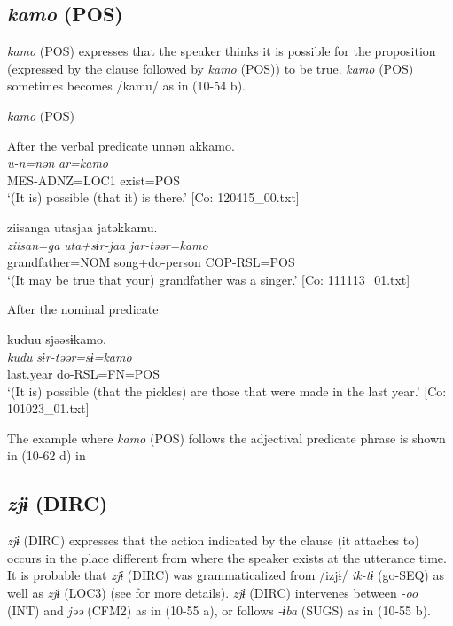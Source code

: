 \begin{xlist}
\subsection{\textit{kamo} (POS)}\label{sec:10.3.8}

\textit{kamo} (POS) expresses that the speaker thinks it is possible for the proposition (expressed by the clause followed by \textit{kamo} (POS)) to be true. \textit{kamo} (POS) sometimes becomes /kamu/ as in (10-54 b).

\ea\label{ex:10.54}   \textit{kamo} (POS)\\
  \begin{xlist}
  \exi{} After the verbal predicate
  \ex  %
      \glll    unnən  akkamo.\\
      \textit{u-n=nən}  \textit{ar=kamo}\\
      MES-ADNZ=LOC1  exist=POS\\
      \glt       ‘(It is) possible (that it) is there.’ [Co: 120415\_00.txt]

  \ex  %
      \glll    ziisanga  utasjaa  jatəkkamu.\\
      \textit{ziisan=ga}  \textit{uta+sɨr-jaa}  \textit{jar-təər=kamo}\\
      grandfather=NOM  song+do-person  COP-RSL=POS\\
      \glt       ‘(It may be true that your) grandfather was a singer.’ [Co: 111113\_01.txt]

  \exi{} After the nominal predicate

  \ex  %
      \glll    kuduu  sjəəsɨkamo.\\
      \textit{kudu}  \textit{sɨr-təər=sɨ=kamo}\\
      last.year  do-RSL=FN=POS\\
      \glt       ‘(It is) possible (that the pickles) are those that were made in the last year.’ [Co: 101023\_01.txt]
    \end{xlist}
\z

The example where \textit{kamo} (POS) follows the adjectival predicate phrase is shown in (10-62 d) in  

\subsection{\textit{zjɨ} (DIRC)}\label{sec:10.3.9}

\textit{zjɨ} (DIRC) expresses that the action indicated by the clause (it attaches to) occurs in the place different from where the speaker exists at the utterance time. It is probable that \textit{zjɨ} (DIRC) was grammaticalized from /izjɨ/ \textit{ik-tɨ} (go-SEQ) as well as \textit{zjɨ} (LOC3) (see  for more details). \textit{zjɨ} (DIRC) intervenes between \textit{{}-oo} (INT) and \textit{jəə} (CFM2) as in (10-55 a), or follows \textit{{}-ɨba} (SUGS) as in (10-55 b).


\end{xlist}
